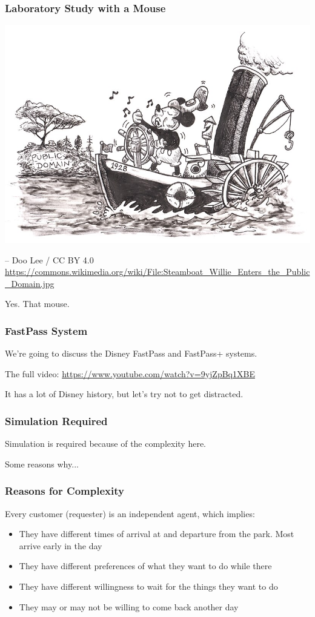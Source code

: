 \begin{frame}
\frametitle{Laboratory Study with a Mouse}

\begin{center}
	\includegraphics[width=.7\textwidth]{images/800px-Steamboat_Willie_Enters_the_Public_Domain.jpg}
\end{center}
         \hfill -- Doo Lee / CC BY 4.0 \\[-.5em]
         \hfill {\tiny \url{https://commons.wikimedia.org/wiki/File:Steamboat_Willie_Enters_the_Public_Domain.jpg}}

Yes. That mouse.


\end{frame}


\begin{frame}
\frametitle{FastPass System}

We're going to discuss the Disney FastPass and FastPass+ systems.

The full video: \url{https://www.youtube.com/watch?v=9yjZpBq1XBE}

It has a lot of Disney history, but let's try not to get distracted.

\end{frame}


\begin{frame}
\frametitle{Simulation Required}

Simulation is required because of the complexity here.

Some reasons why...

\end{frame}


\begin{frame}
\frametitle{Reasons for Complexity}

Every customer (requester) is an independent agent, which implies:
		\begin{itemize}
			\item They have different times of arrival at and departure from the park. Most arrive early in the day
			\item They have different preferences of what they want to do while there
			\item They have different willingness to wait for the things they want to do
			\item They may or may not be willing to come back another day
		\end{itemize}


\end{frame}


